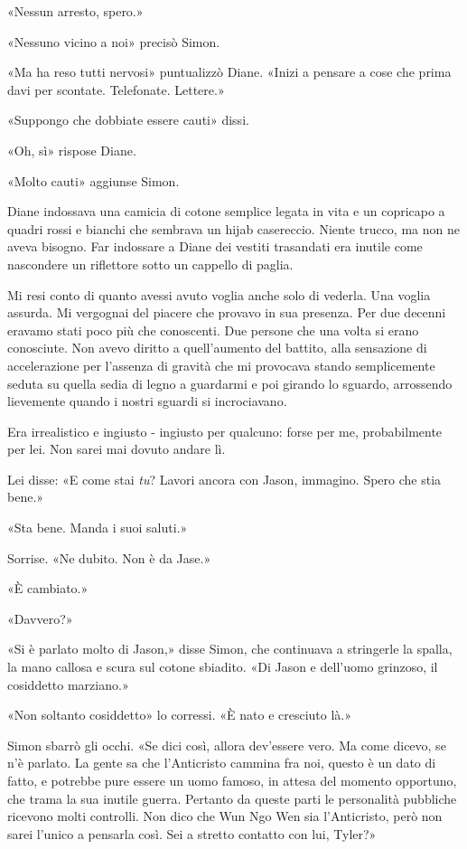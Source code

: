 «Nessun arresto, spero.»

«Nessuno vicino a noi» precisò Simon.

«Ma ha reso tutti nervosi» puntualizzò Diane. «Inizi a pensare a cose
che prima davi per scontate. Telefonate. Lettere.»

«Suppongo che dobbiate essere cauti» dissi.

«Oh, sì» rispose Diane.

«Molto cauti» aggiunse Simon.

Diane indossava una camicia di cotone semplice legata in vita e un
copricapo a quadri rossi e bianchi che sembrava un hijab casereccio.
Niente trucco, ma non ne aveva bisogno. Far indossare a Diane dei
vestiti trasandati era inutile come nascondere un riflettore sotto un
cappello di paglia.

Mi resi conto di quanto avessi avuto voglia anche solo di vederla. Una
voglia assurda. Mi vergognai del piacere che provavo in sua presenza.
Per due decenni eravamo stati poco più che conoscenti. Due persone che
una volta si erano conosciute. Non avevo diritto a quell'aumento del
battito, alla sensazione di accelerazione per l'assenza di gravità che
mi provocava stando semplicemente seduta su quella sedia di legno a
guardarmi e poi girando lo sguardo, arrossendo lievemente quando i
nostri sguardi si incrociavano.

Era irrealistico e ingiusto - ingiusto per qualcuno: forse per me,
probabilmente per lei. Non sarei mai dovuto andare lì.

Lei disse: «E come stai \emph{tu}? Lavori ancora con Jason, immagino.
Spero che stia bene.»

«Sta bene. Manda i suoi saluti.»

Sorrise. «Ne dubito. Non è da Jase.»

«È cambiato.»

«Davvero?»

«Si è parlato molto di Jason,» disse Simon, che continuava a stringerle
la spalla, la mano callosa e scura sul cotone sbiadito. «Di Jason e
dell'uomo grinzoso, il cosiddetto marziano.»

«Non soltanto cosiddetto» lo corressi. «È nato e cresciuto là.»

Simon sbarrò gli occhi. «Se dici così, allora dev'essere vero. Ma come
dicevo, se n'è parlato. La gente sa che l'Anticristo cammina fra noi,
questo è un dato di fatto, e potrebbe pure essere un uomo famoso, in
attesa del momento opportuno, che trama la sua inutile guerra. Pertanto
da queste parti le personalità pubbliche ricevono molti controlli. Non
dico che Wun Ngo Wen sia l'Anticristo, però non sarei l'unico a pensarla
così. Sei a stretto contatto con lui, Tyler?»

